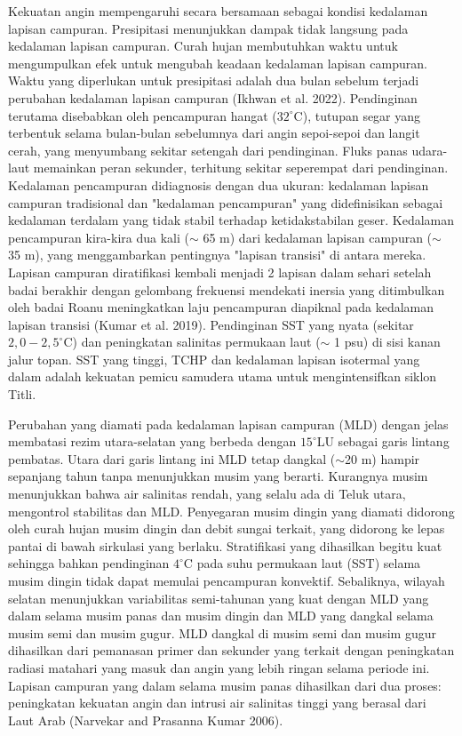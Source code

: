 \begin{spacing}{1.5}
	Kekuatan angin mempengaruhi secara bersamaan sebagai kondisi kedalaman lapisan campuran. Presipitasi menunjukkan dampak tidak langsung pada kedalaman lapisan campuran. Curah hujan membutuhkan waktu untuk mengumpulkan efek untuk mengubah keadaan kedalaman lapisan campuran. Waktu yang diperlukan untuk presipitasi adalah dua bulan sebelum terjadi perubahan kedalaman lapisan campuran  (Ikhwan et al. 2022). Pendinginan terutama disebabkan oleh pencampuran hangat ($32^\circ$C), tutupan segar yang terbentuk selama bulan-bulan sebelumnya dari angin sepoi-sepoi dan langit cerah, yang menyumbang sekitar setengah dari pendinginan. Fluks panas udara-laut memainkan peran sekunder, terhitung sekitar seperempat dari pendinginan. Kedalaman pencampuran didiagnosis dengan dua ukuran: kedalaman lapisan campuran tradisional dan "kedalaman pencampuran" yang didefinisikan sebagai kedalaman terdalam yang tidak stabil terhadap ketidakstabilan geser. Kedalaman pencampuran kira-kira dua kali ($\sim$ 65 m) dari kedalaman lapisan campuran ($\sim$ 35 m), yang menggambarkan pentingnya "lapisan transisi" di antara mereka. Lapisan campuran diratifikasi kembali menjadi 2 lapisan dalam sehari setelah badai berakhir dengan gelombang frekuensi mendekati inersia yang ditimbulkan oleh badai Roanu meningkatkan laju pencampuran diapiknal pada kedalaman lapisan transisi (Kumar et al. 2019). Pendinginan SST yang nyata (sekitar $2,0 - 2,5^\circ$C) dan peningkatan salinitas permukaan laut ($\sim$ 1 psu) di sisi kanan jalur topan. SST yang tinggi, TCHP dan kedalaman lapisan isotermal yang dalam adalah kekuatan pemicu samudera utama untuk mengintensifkan siklon Titli.
	
	Perubahan yang diamati pada kedalaman lapisan campuran (MLD) dengan jelas membatasi rezim utara-selatan yang berbeda dengan $15^\circ$LU sebagai garis lintang pembatas. Utara dari garis lintang ini MLD tetap dangkal ($\sim$20 m) hampir sepanjang tahun tanpa menunjukkan musim yang berarti. Kurangnya musim menunjukkan bahwa air salinitas rendah, yang selalu ada di Teluk utara, mengontrol stabilitas dan MLD. Penyegaran musim dingin yang diamati didorong oleh curah hujan musim dingin dan debit sungai terkait, yang didorong ke lepas pantai di bawah sirkulasi yang berlaku. Stratifikasi yang dihasilkan begitu kuat sehingga bahkan pendinginan $4^\circ$C pada suhu permukaan laut (SST) selama musim dingin tidak dapat memulai pencampuran konvektif. Sebaliknya, wilayah selatan menunjukkan variabilitas semi-tahunan yang kuat dengan MLD yang dalam selama musim panas dan musim dingin dan MLD yang dangkal selama musim semi dan musim gugur. MLD dangkal di musim semi dan musim gugur dihasilkan dari pemanasan primer dan sekunder yang terkait dengan peningkatan radiasi matahari yang masuk dan angin yang lebih ringan selama periode ini. Lapisan campuran yang dalam selama musim panas dihasilkan dari dua proses: peningkatan kekuatan angin dan intrusi air salinitas tinggi yang berasal dari Laut Arab (Narvekar and Prasanna Kumar 2006).
	

\end{spacing}
